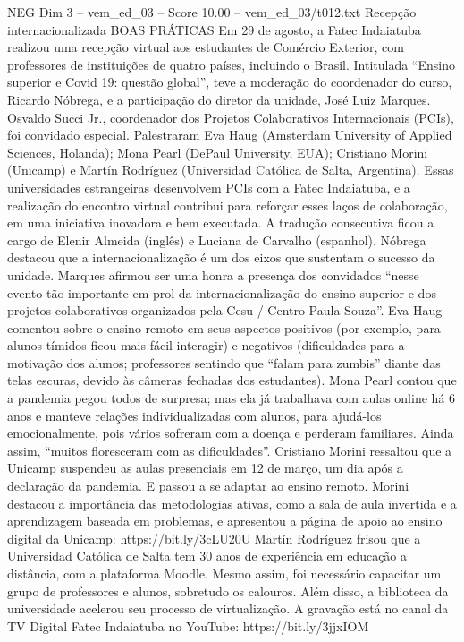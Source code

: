 \begin{textsample}{NEG Dim 3 – vem\_ed\_03 – Score 10.00 – vem\_ed\_03/t012.txt}  \label{ex:f3_neg_155}
Recepção internacionalizada BOAS PRÁTICAS Em 29 de agosto, a Fatec Indaiatuba realizou uma recepção virtual aos estudantes de Comércio Exterior, com professores de instituições de quatro países, incluindo o Brasil.
Intitulada “Ensino superior e Covid 19: questão global”, teve a moderação do coordenador do curso, Ricardo Nóbrega, e a participação do diretor da unidade, José Luiz Marques.
Osvaldo Succi Jr., coordenador dos Projetos Colaborativos Internacionais (PCIs), foi convidado especial.
Palestraram Eva Haug (Amsterdam University of Applied Sciences, Holanda); Mona Pearl (DePaul University, EUA); Cristiano Morini (Unicamp) e Martín Rodríguez (Universidad Católica de Salta, Argentina).
Essas universidades estrangeiras desenvolvem PCIs com a Fatec Indaiatuba, e a realização do encontro virtual contribui para reforçar esses laços de colaboração, em uma iniciativa inovadora e bem executada.
A tradução consecutiva ficou a cargo de Elenir Almeida (inglês) e Luciana de Carvalho (espanhol).
Nóbrega destacou que a internacionalização é um dos eixos que sustentam o sucesso da unidade.
Marques afirmou ser uma honra a presença dos convidados “nesse evento tão importante em prol da internacionalização do ensino superior e dos projetos colaborativos organizados pela Cesu / Centro Paula Souza”.
Eva Haug comentou sobre o ensino remoto em seus aspectos positivos (por exemplo, para alunos tímidos ficou mais fácil interagir) e negativos (dificuldades para a motivação dos alunos; professores sentindo que “falam para zumbis” diante das telas escuras, devido às câmeras fechadas dos estudantes).
Mona Pearl contou que a pandemia pegou todos de surpresa; mas ela já trabalhava com aulas online há 6 anos e manteve relações individualizadas com alunos, para ajudá-los emocionalmente, pois vários sofreram com a doença e perderam familiares.
Ainda assim, “muitos floresceram com as dificuldades”.
Cristiano Morini ressaltou que a Unicamp suspendeu as aulas presenciais em 12 de março, um dia após a declaração da pandemia.
E passou a se adaptar ao ensino remoto.
Morini destacou a importância das metodologias ativas, como a sala de aula invertida e a aprendizagem baseada em problemas, e apresentou a página de apoio ao ensino digital da Unicamp: https://bit.ly/3cLU20U Martín Rodríguez frisou que a Universidad Católica de Salta tem 30 anos de experiência em educação a distância, com a plataforma Moodle.
Mesmo assim, foi necessário capacitar um grupo de professores e alunos, sobretudo os calouros.
Além disso, a biblioteca da universidade acelerou seu processo de virtualização.
A gravação está no canal da TV Digital Fatec Indaiatuba no YouTube: https://bit.ly/3jjxIOM

\end{textsample}
